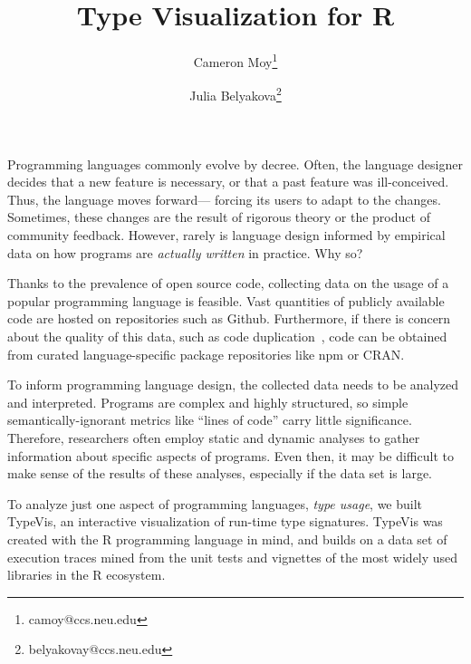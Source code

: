 \documentclass{vgtc}                          %
\title{Type Visualization for R}
\author{Cameron Moy\thanks{camoy@ccs.neu.edu}
\and Julia Belyakova\thanks{belyakovay@ccs.neu.edu}}
\affiliation{\scriptsize Northeastern University}
\newcommand{\typevis}{{\sc TypeVis}\xspace}
\begin{document}

\maketitle

Programming languages commonly evolve by decree. Often, the language designer
decides that a new feature is necessary, or that a past feature was
ill-conceived. Thus, the language moves forward---
forcing its users to adapt to the changes.
Sometimes, these changes are the result of rigorous theory
or the product of community feedback. However, rarely is language design
informed by empirical data on how programs are \emph{actually
written} in practice. Why so?

Thanks to the prevalence of open source code, collecting data on
the usage of a popular programming language is feasible. Vast
quantities of publicly available code are hosted on repositories such as Github.
Furthermore, if there is concern about the quality of this data,
such as code duplication~\cite{lopes:2017},
code can be obtained from curated
language-specific package repositories like npm or CRAN.

To inform programming language design,
the collected data needs to be analyzed and interpreted.
Programs are complex and highly structured,
so simple semantically-ignorant metrics like ``lines of code'' carry little significance.
Therefore, researchers often employ static and dynamic analyses
to gather information about specific aspects of programs.
Even then, it may be difficult to make sense of the
results of these analyses,
especially if the data set is large.

To analyze just one aspect of programming languages, \emph{type usage}, we
built \typevis, an interactive visualization of run-time type signatures.
\typevis was created with the R programming language in mind,
and builds on a data set of execution traces
mined from the unit tests and vignettes
of the most widely used libraries in the R ecosystem.
\end{document}
